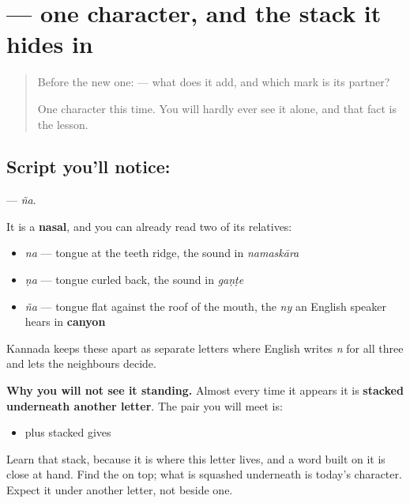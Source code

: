 \section[\texorpdfstring{\kn{ಞ} (ña)}{ಞ (ña)}]{ — one character, and the stack it hides in}

\label{lesson:KA-S133-letter-nya}



\begin{quote}
Before the new one:  — what does it add, and which mark is its partner?

One character this time. You will hardly ever see it alone, and that fact is the lesson.
\end{quote}

\subsection*{Script you'll notice: }
\textbf{} — \emph{ña}.

It is a \textbf{nasal}, and you can already read two of its relatives:

\begin{itemize}
\raggedright
  \item \textbf{} \emph{na} — tongue at the teeth ridge, the sound in \textbf{} \emph{namaskāra}
  \item \textbf{} \emph{ṇa} — tongue curled back, the sound in \textbf{} \emph{gaṇṭe}
  \item \textbf{} \emph{ña} — tongue flat against the roof of the mouth, the \emph{ny} an English speaker hears in \textbf{canyon}
\end{itemize}

Kannada keeps these apart as separate letters where English writes \emph{n} for all three and lets the neighbours decide.

\textbf{Why you will not see it standing.} Almost every time it appears it is \textbf{stacked underneath another letter}. The pair you will meet is:

\begin{itemize}
\raggedright
  \item \textbf{} plus \textbf{} stacked gives \textbf{}
\end{itemize}

Learn that stack, because it is where this letter lives, and a word built on it is close at hand. Find the \textbf{} on top; what is squashed underneath is today's character. Expect it under another letter, not beside one.

